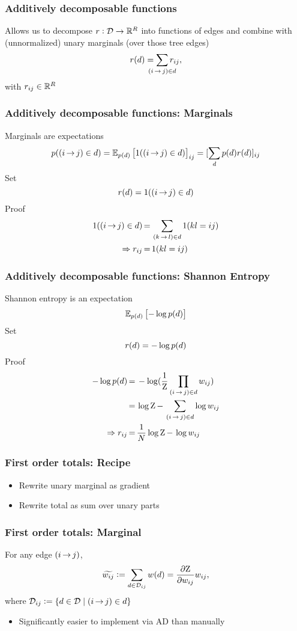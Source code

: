 \documentclass{beamer}
\newcommand{\defeq}{\vcentcolon=}
\begin{document}
\begin{frame}
\frametitle{Additively decomposable functions}
Allows us to decompose $r:\mathcal{D}\to\mathbb{R}^{R}$
into functions of edges and combine with (unnormalized)
unary marginals (over those tree edges)
\begin{equation}
    \rtree{\tree} = \smashoperator{\sum_{\edgeij\in\tree}}\redge{ij},
\end{equation}
with ${r_{ij}}\in\mathbb{R}^{R}$
\end{frame}

\begin{frame}
\frametitle{Additively decomposable functions: Marginals}
Marginals are expectations
$$p({(i\,{\rightarrow}\,j)}\in{d}) = \mathbb{E}_{{p({d})}}\left[1({(i\,{\rightarrow}\,j)}\in{d})\right]_{ij} = [\sum_d p(d)r(d)]_{ij}$$
Set
$${r({d})} = 1({(i\,{\rightarrow}\,j)}\in{d})$$
Proof
\begin{align*}
1({(i\,{\rightarrow}\,j)}\in{d}) &\,{=}\, \sum_{{(k\,{\rightarrow}\,l)}\in{d}}1(kl = ij)\\
\Rightarrow {r_{ij}} &\,{=}\, 1(kl=ij)
\end{align*}
\end{frame}

\begin{frame}
\frametitle{Additively decomposable functions: Shannon Entropy}
Shannon entropy is an expectation
$$\mathbb{E}_{{p({d})}}\left[-\log {p({d})}\right]$$
Set
$${r({d})} = -\log {p({d})}$$
Proof
\begin{align*}
-\log {p({d})} &\,{=}\, -\log(\frac{1}{{\mathrm{Z}}} \prod_{{(i\,{\rightarrow}\,j)}\in{d}} {w_{ij}})\\
&\,{=}\, \log{\mathrm{Z}} \,{-}\, \sum_{{(i\,{\rightarrow}\,j)} \in {d}} \log{w_{ij}}\\
\Rightarrow {r_{ij}} &\,{=}\, \frac{1}{{N}}\log{\mathrm{Z}}\,{-}\,\log{w_{ij}}
\end{align*}
\end{frame}

\begin{frame}
\frametitle{First order totals: Recipe}
\begin{itemize}
\item Rewrite unary marginal as gradient
\item Rewrite total as sum over unary parts
\end{itemize}
\end{frame}

\begin{frame}
\frametitle{First order totals: Marginal}
For any edge ${(i\,{\rightarrow}\,j)}$,
\begin{equation}
    \totalw{ij} \defeq \sum_{\tree\in\inc{ij}}\wtree{\tree}=\frac{\partial \wbar}{\partial \wedge{ij}}\wedge{ij},
\end{equation}
where $\inc{ij}\defeq \{ \tree \in \st \mid \edgeij \in \tree \}$
\vspace{2em}
\begin{itemize}
\item Significantly easier to implement via AD than manually
\end{itemize}
\end{frame}
\end{document}
